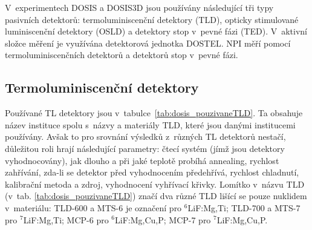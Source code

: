 
V~experimentech DOSIS a DOSIS3D jsou používány následující tři typy pasivních detektorů: termoluminiscenční detektory (TLD), opticky stimulované luminiscenční detektory (OSLD) a detektory stop v~pevné fázi (TED). V~aktivní složce měření je využívána detektorová jednotka DOSTEL. NPI měří pomocí termoluminiscenčních detektorů a detektorů stop v~pevné fázi. 
\subsection{Termoluminiscenční detektory}\label{sec:dosis_TLD}
Používané TL detektory jsou v~tabulce~\ref{tab:dosis_pouzivaneTLD}. Ta obsahuje název instituce spolu s~názvy a materiály TLD, které jsou danými institucemi používány. Avšak to pro srovnání výsledků z~různých TL detektorů nestačí, důležitou roli hrají následující parametry: čtecí systém (jímž jsou detektory vyhodnocovány), jak dlouho a při jaké teplotě probíhá annealing, rychlost zahřívání, zda-li se detektor před vyhodnocením předehřívá, rychlost chladnutí, kalibrační metoda a zdroj, vyhodnocení vyhřívací křivky. Lomítko v~názvu TLD (v~tab. \ref{tab:dosis_pouzivaneTLD}) značí dva různé TLD lišící se pouze nuklidem v~materiálu: TLD-600 a MTS-6 je označení pro $^6$LiF:Mg,Ti; TLD-700 a MTS-7 pro $^7$LiF:Mg,Ti; MCP-6 pro $^6$LiF:Mg,Cu,P; MCP-7 pro $^7$LiF:Mg,Cu,P. %

